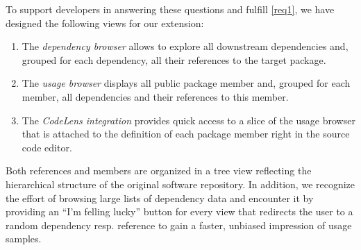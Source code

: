 To support developers in answering these questions and fulfill \cref{req1}, we have designed the following views for our extension:

\begin{enumerate}[label=(\roman*)]
	\item The \emph{dependency browser} allows to explore all downstream dependencies and, grouped for each dependency, all their references to the target package.
	\item The \emph{usage browser} displays all public package member and, grouped for each member, all dependencies and their references to this member.
	\item The \emph{CodeLens integration} provides quick access to a slice of the usage browser that is attached to the definition of each package member right in the source code editor.
\end{enumerate}

Both references and members are organized in a tree view reflecting the hierarchical structure of the original software repository.
In addition, we recognize the effort of browsing large lists of dependency data and encounter it by providing an ``I'm felling lucky'' button for every view that redirects the user to a random dependency resp. reference to gain a faster, unbiased impression of usage samples.
